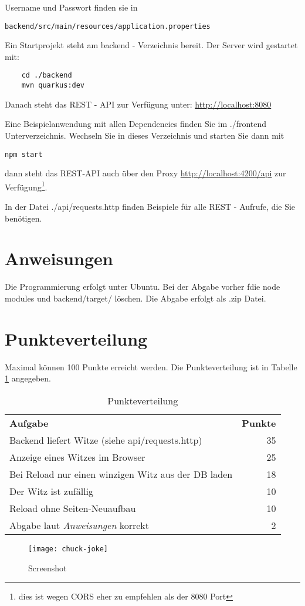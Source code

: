 \documentclass[a4paper, 11pt]{article}
\begin{document}
Username und Passwort finden sie in \begin{verbatim}backend/src/main/resources/application.properties\end{verbatim}

Ein Startprojekt steht am backend - Verzeichnis bereit. 
Der Server wird gestartet mit:
\begin{verbatim}
	cd ./backend
	mvn quarkus:dev
\end{verbatim}
Danach steht das REST - API zur Verfügung unter:
\href{http://localhost:8080}{http://localhost:8080}

Eine Beispielanwendung mit allen Dependencies finden Sie im ./frontend Unterverzeichnis.
Wechseln Sie in dieses Verzeichnis und starten Sie dann mit
\begin{verbatim}
npm start
\end{verbatim}

dann steht das REST-API auch über den Proxy 
\href{http://localhost:4200/api}{http://localhost:4200/api} zur Verfügung\footnote{dies ist wegen CORS eher zu empfehlen als der 8080 Port}.

In der Datei ./api/requests.http finden Beispiele für alle REST - Aufrufe, die Sie benötigen. 
\section{Anweisungen}

Die Programmierung erfolgt unter Ubuntu.
Bei der Abgabe vorher fdie node modules und backend/target/ löschen. Die Abgabe erfolgt als .zip Datei.

\section{Punkteverteilung}
Maximal können 100 Punkte erreicht werden. Die Punkteverteilung ist in Tabelle \ref{tab:points} angegeben.
\begin{table}[ht]
\centering
\caption{Punkteverteilung}

\begin{tabular}{| l | r |} \cline{1-2} 
\textbf{Aufgabe} &  \textbf{Punkte}  \\ \cline{1-2}
Backend liefert Witze (siehe api/requests.http) & 35 \\ \cline{1-2}
Anzeige eines Witzes im Browser & 25 \\ \cline{1-2}
Bei Reload nur einen winzigen Witz aus der DB laden & 18 \\ \cline{1-2}
Der Witz ist zufällig & 10 \\ \cline{1-2}
Reload ohne Seiten-Neuaufbau & 10 \\ \cline{1-2}
Abgabe laut \textit{Anweisungen} korrekt & 2 \\ \cline{1-2}
\end{tabular}
\label{tab:points}
\end{table}

\begin{figure}
	\center
	\texttt{[image: chuck-joke]}
	\caption{Screenshot}
	\label{fig:img}
\end{figure}
\end{document}
